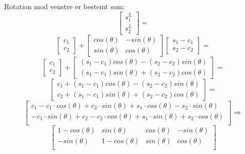 \documentclass[a4paper,12pt]{article}
\begin{document}
\subsection{}
Rotation mod venstre er bestemt som:\\

\[
\left[\begin{array}{ccc}
    s^L_1\\
    s^L_2
\end{array}\right]
=
\]
\[
\left[\begin{array}{ccc}
    c_1\\
    c_2
\end{array}\right]
+
\left[\begin{array}{cc}
    cos(\theta) & -sin(\theta)\\
    sin(\theta) & cos(\theta)
\end{array}\right]
\left[\begin{array}{cc}
    s_1 -c_1\\
    s_2 -c_2
\end{array}\right]
=
\]
\[
\left[\begin{array}{ccc}
    c_1\\
    c_2
\end{array}\right]
+
\left[\begin{array}{c}
    (s_1-c_1)cos(\theta) - (s_2-c_2) sin(\theta) \\
    (s_1-c_1) sin(\theta) + (s_2-c_2) cos(\theta)
\end{array}\right]
=
\]
\[
\left[\begin{array}{c}
    c_1 +(s_1-c_1)cos(\theta) - (s_2-c_2) sin(\theta) \\
    c_2 + (s_1-c_1) sin(\theta) + (s_2-c_2) cos(\theta)
\end{array}\right]
=
\]
\[
\left[\begin{array}{cccc}
    c_1 - c_1\cdot cos(\theta) + c_2 \cdot sin(\theta) + s_1 \cdot cos(\theta) - s_2\cdot sin(\theta)\\
    -c_1\cdot sin(\theta) + c_2 - c_2 \cdot cos(\theta) + s_1 \cdot sin(\theta) + s_2\cdot cos(\theta)\\
\end{array}\right]
\Rightarrow
\]
\[
\left[\begin{array}{cccc}
    1 - cos(\theta) & sin(\theta) & cos(\theta) &  -sin(\theta)\\
    -sin(\theta) & 1 - cos(\theta) & sin(\theta) & cos(\theta)\\
\end{array}\right]
\]\\
\end{document}
